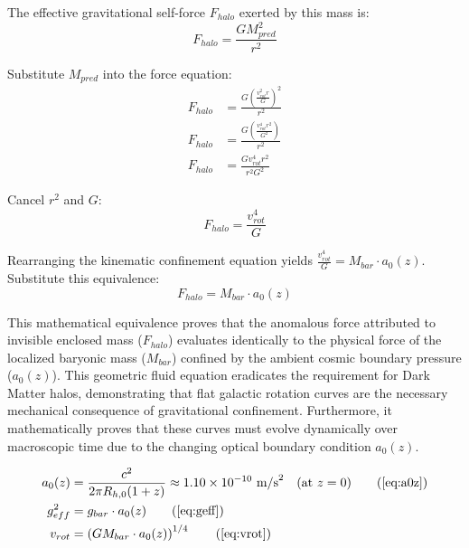 \documentclass[11pt, a4paper]{article}
\begin{document}
The effective gravitational self-force $F_{halo}$ exerted by this mass is:
\begin{equation}
    F_{halo} = \frac{G M_{pred}^2}{r^2} \nonumber
\end{equation}

Substitute $M_{pred}$ into the force equation:
\begin{align}
    F_{halo} &= \frac{G \left( \frac{v_{rot}^2 r}{G} \right)^2}{r^2} \nonumber \\
    F_{halo} &= \frac{G \left( \frac{v_{rot}^4 r^2}{G^2} \right)}{r^2} \nonumber \\
    F_{halo} &= \frac{G v_{rot}^4 r^2}{r^2 G^2} \nonumber
\end{align}

Cancel $r^2$ and $G$:
\begin{equation}
    F_{halo} = \frac{v_{rot}^4}{G} \nonumber
\end{equation}

Rearranging the kinematic confinement equation yields $\frac{v_{rot}^4}{G} = M_{bar} \cdot a_0(z)$. Substitute this equivalence:
\begin{equation}
    F_{halo} = M_{bar} \cdot a_0(z) \nonumber
\end{equation}

This mathematical equivalence proves that the anomalous force attributed to invisible enclosed mass ($F_{halo}$) evaluates identically to the physical force of the localized baryonic mass ($M_{bar}$) confined by the ambient cosmic boundary pressure ($a_0(z)$). This geometric fluid equation eradicates the requirement for Dark Matter halos, demonstrating that flat galactic rotation curves are the necessary mechanical consequence of gravitational confinement. Furthermore, it mathematically proves that these curves must evolve dynamically over macroscopic time due to the changing optical boundary condition $a_0(z)$.

\begin{tcolorbox}[recallbox, title={\ref{box:mond}. Entropic Superposition (MOND)}]
\begin{align}
    a_0(z) &= \frac{c^2}{2\pi R_{h,0}(1+z)} \approx 1.10 \times 10^{-10} \text{ m/s}^2 \quad \text{(at } z=0\text{)}\tag{\ref{eq:a0z}} \\
    g_{eff}^2 &= g_{bar} \cdot a_0(z) \tag{\ref{eq:geff}} \\
    v_{rot} &= \left( G M_{bar} \cdot a_0(z) \right)^{1/4} \tag{\ref{eq:vrot}}
\end{align}
\end{tcolorbox}
\end{document}
